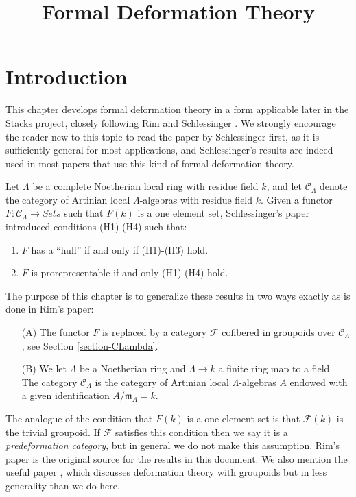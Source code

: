 


%


\title{Formal Deformation Theory}


\maketitle

\label{section-phantom}

\tableofcontents



\section{Introduction}
\label{section-introduction}

\noindent
This chapter develops formal deformation theory in a form applicable
later in the Stacks project, closely following Rim \cite[Exposee VI]{SGA7-I}
and Schlessinger \cite{Sch}. We strongly encourage the reader new to
this topic to read the paper by Schlessinger first, as it is sufficiently
general for most applications, and Schlessinger's results are indeed
used in most papers that use this kind of formal deformation theory.

\medskip\noindent
Let $\Lambda$ be a complete Noetherian local ring with residue field $k$,
and let $\mathcal{C}_\Lambda$ denote the category of Artinian local
$\Lambda$-algebras with residue field $k$. Given a functor
$F : \mathcal{C}_\Lambda \to \textit{Sets}$ such that $F(k)$
is a one element set, Schlessinger's paper introduced conditions
(H1)-(H4) such that:
\begin{enumerate}
\item $F$ has a ``hull'' if and only if (H1)-(H3) hold.
\item $F$ is prorepresentable if and only (H1)-(H4) hold.
\end{enumerate}
The purpose of this chapter is to generalize these results in two ways
exactly as is done in Rim's paper:
\begin{enumerate}
\item[(A)] The functor $F$ is replaced by a category $\mathcal{F}$ cofibered
in groupoids over $\mathcal{C}_\Lambda$, see
Section \ref{section-CLambda}.
\item[(B)] We let $\Lambda$ be a Noetherian ring and $\Lambda \to k$
a finite ring map to a field. The category $\mathcal{C}_\Lambda$ is
the category of Artinian local $\Lambda$-algebras $A$ endowed with a
given identification $A/\mathfrak m_A = k$.
\end{enumerate}
The analogue of the condition that $F(k)$ is a  one element set is that
$\mathcal{F}(k)$ is the trivial groupoid. If $\mathcal{F}$ satisfies this
condition then we say it is a {\it predeformation category}, but in  general
we do not make this assumption.  Rim's paper \cite[Exposee VI]{SGA7-I} is the
original source for the results in this document. We also mention the useful
paper \cite{Vistoli}, which discusses deformation theory with groupoids but
in less generality than we do here.

